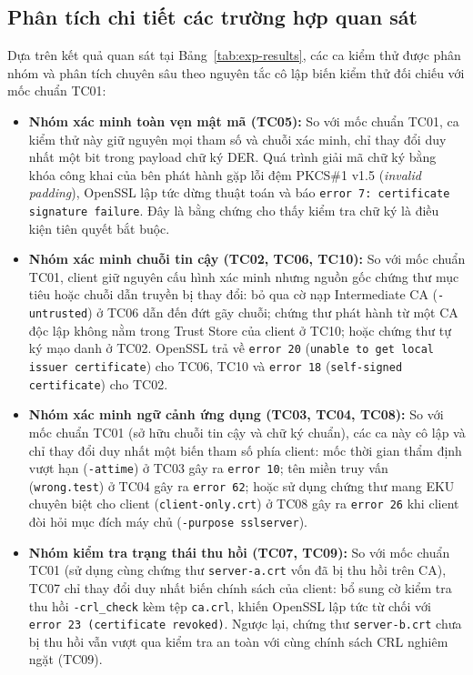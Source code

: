 \subsection{Phân tích chi tiết các trường hợp quan sát}
\label{subsec:exp-analysis-cases}
Dựa trên kết quả quan sát tại Bảng~\ref{tab:exp-results}, các ca kiểm thử được phân nhóm và phân tích chuyên sâu theo nguyên tắc cô lập biến kiểm thử đối chiếu với mốc chuẩn TC01:
\begin{itemize}
    \item \textbf{Nhóm xác minh toàn vẹn mật mã (TC05):} So với mốc chuẩn TC01, ca kiểm thử này giữ nguyên mọi tham số và chuỗi xác minh, chỉ thay đổi duy nhất một bit trong payload chữ ký DER. Quá trình giải mã chữ ký bằng khóa công khai của bên phát hành gặp lỗi đệm PKCS\#1 v1.5 (\textit{invalid padding}), OpenSSL lập tức dừng thuật toán và báo \texttt{error 7: certificate signature failure}. Đây là bằng chứng cho thấy kiểm tra chữ ký là điều kiện tiên quyết bắt buộc.
    \item \textbf{Nhóm xác minh chuỗi tin cậy (TC02, TC06, TC10):} So với mốc chuẩn TC01, client giữ nguyên cấu hình xác minh nhưng nguồn gốc chứng thư mục tiêu hoặc chuỗi dẫn truyền bị thay đổi: bỏ qua cờ nạp Intermediate CA (\texttt{-untrusted}) ở TC06 dẫn đến đứt gãy chuỗi; chứng thư phát hành từ một CA độc lập không nằm trong Trust Store của client ở TC10; hoặc chứng thư tự ký mạo danh ở TC02. OpenSSL trả về \texttt{error 20} (\texttt{unable to get local issuer certificate}) cho TC06, TC10 và \texttt{error 18} (\texttt{self-signed certificate}) cho TC02.
    \item \textbf{Nhóm xác minh ngữ cảnh ứng dụng (TC03, TC04, TC08):} So với mốc chuẩn TC01 (sở hữu chuỗi tin cậy và chữ ký chuẩn), các ca này cô lập và chỉ thay đổi duy nhất một biến tham số phía client: mốc thời gian thẩm định vượt hạn (\texttt{-attime}) ở TC03 gây ra \texttt{error 10}; tên miền truy vấn (\texttt{wrong.test}) ở TC04 gây ra \texttt{error 62}; hoặc sử dụng chứng thư mang EKU chuyên biệt cho client (\texttt{client-only.crt}) ở TC08 gây ra \texttt{error 26} khi client đòi hỏi mục đích máy chủ (\texttt{-purpose sslserver}).
    \item \textbf{Nhóm kiểm tra trạng thái thu hồi (TC07, TC09):} So với mốc chuẩn TC01 (sử dụng cùng chứng thư \texttt{server-a.crt} vốn đã bị thu hồi trên CA), TC07 chỉ thay đổi duy nhất biến chính sách của client: bổ sung cờ kiểm tra thu hồi \texttt{-crl\_check} kèm tệp \texttt{ca.crl}, khiến OpenSSL lập tức từ chối với \texttt{error 23 (certificate revoked)}. Ngược lại, chứng thư \texttt{server-b.crt} chưa bị thu hồi vẫn vượt qua kiểm tra an toàn với cùng chính sách CRL nghiêm ngặt (TC09).
\end{itemize}

